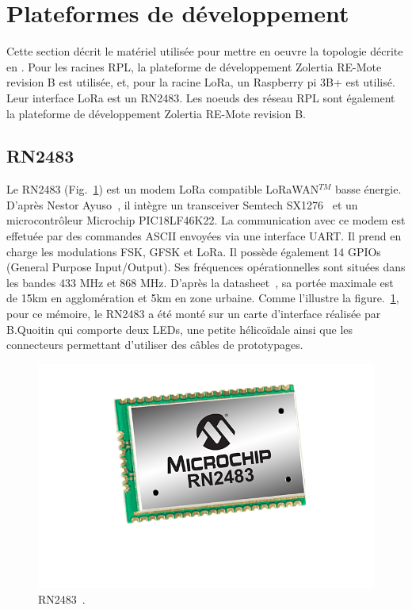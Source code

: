 \section{Plateformes de développement}\label{hardware}
\renewcommand{\rightmark}{Plateformes de développement}
    Cette section décrit le matériel utilisée pour mettre en oeuvre la topologie décrite en . Pour les racines RPL, la plateforme de développement Zolertia RE-Mote revision B est utilisée, et,  pour la racine LoRa, un Raspberry pi 3B+ est utilisé. Leur interface LoRa est un RN2483. Les noeuds des réseau RPL sont également la plateforme de développement Zolertia RE-Mote revision B.

\subsection*{RN2483}\label{hardware:rn2483}
    Le RN2483 (Fig.~\ref{fig:state-rn2483}) est un modem LoRa compatible LoRaWAN$^{TM}$ basse énergie. D'après Nestor Ayuso~\cite{ayuso_2015}, il intègre un transceiver Semtech SX1276~\cite{sx1276:datasheet} et un microcontrôleur Microchip PIC18LF46K22.
    La communication avec ce modem est effetuée par des commandes ASCII envoyées via une interface UART. Il prend en charge les modulations FSK, GFSK et LoRa. Il possède également 14 GPIOs (General Purpose Input/Output).
    Ses fréquences opérationnelles sont situées dans les bandes 433 MHz et 868 MHz.
    D'après la datasheet~\cite{rn2483:datasheet}, 
    sa portée maximale est de 15km en agglomération et 5km en zone urbaine. Comme l'illustre la figure.~\ref{fig:state-rn2483}, pour ce mémoire, le RN2483 a été monté sur un carte d'interface réalisée par B.Quoitin qui comporte deux LEDs, une petite hélicoïdale ainsi que les connecteurs permettant d'utiliser des câbles de prototypages.

    \begin{figure}[H]%
        \centering
        \includegraphics[scale=0.3]{res/pictures/rn2483.png}
        \caption{RN2483~\cite{rn2483:shop}.}
        \label{fig:state-rn2483}
    \end{figure}

